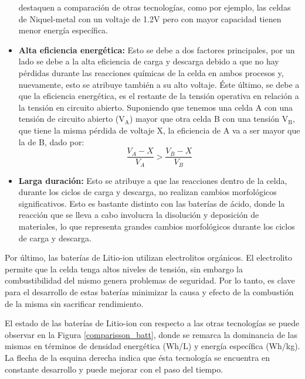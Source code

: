 \documentclass[10pt,a4paper]{article}
\begin{document}
\begin{itemize}
    destaquen a comparación de otras tecnologías, como por ejemplo, las celdas 
    de Niquel-metal con un voltaje de 1.2V pero con mayor capacidad tienen menor 
    energía específica. 
    \item \textbf{Alta eficiencia energética:} Esto se debe a dos 
	factores principales, por un lado se debe a la alta eficiencia de 
	carga y descarga debido a que no hay pérdidas durante las reacciones 
	químicas de la celda en ambos procesos y, nuevamente, esto se atribuye 
	también a su alto voltaje. Éste último, se debe a que la eficiencia 
	energética, es el restante de la tensión operativa en relación a la 
	tensión en circuito abierto. Suponiendo que tenemos una celda A con una 
	tensión de circuito abierto ($\mathrm{V_A}$) mayor que otra celda B con 
	una tensión $\mathrm{V_B}$, que tiene la misma pérdida de voltaje X, 
	la eficiencia de A va a ser mayor que la de B, dado por:
	\vspace{5mm}
	\begin{equation}
	    \frac{V_A - X}{V_A} > \frac{V_B - X}{V_B} \nonumber
	\end{equation}
    \item \textbf{Larga duración:} Esto se atribuye a que las reacciones 
	dentro de la celda, durante los ciclos de carga y descarga, no realizan 
	cambios morfológicos significativos. Esto es bastante distinto con las 
	baterías de ácido, donde la reacción que se lleva a cabo involucra la 
	disolución y deposición de materiales, lo que representa grandes 
	cambios morfológicos durante los ciclos de carga y descarga.
\end{itemize}

\noindent Por último, las baterías de Litio-ion utilizan electrolitos orgánicos.
El electrolito permite que la celda tenga altos niveles de tensión, sin embargo
la combustibilidad del mismo genera problemas de seguridad. Por lo tanto, es
clave para el desarrollo de estas baterías minimizar la causa y efecto de la
combustión de la misma sin sacrificar rendimiento.

\noindent El estado de las baterías de Litio-ion con respecto a las otras
tecnologías se puede observar en la Figura \ref{comparisson_batt}, donde se
remarca la dominancia de las mismas en términos de densidad energética (Wh/L) y 
energía específica (Wh/kg). La flecha de la esquina derecha indica que ésta 
tecnología se encuentra en constante desarrollo y puede mejorar con el paso del 
tiempo.
\end{document}
